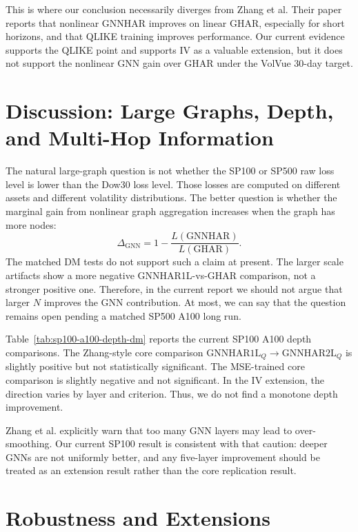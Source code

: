 \documentclass[11pt]{article}
\begin{document}


This is where our conclusion necessarily diverges from Zhang et al.
Their paper reports that nonlinear GNNHAR improves on linear GHAR, especially for short horizons, and that QLIKE training improves performance.
Our current evidence supports the QLIKE point and supports IV as a valuable extension, but it does not support the nonlinear GNN gain over GHAR under the VolVue 30-day target.

\section{Discussion: Large Graphs, Depth, and Multi-Hop Information}

The natural large-graph question is not whether the SP100 or SP500 raw loss level is lower than the Dow30 loss level.
Those losses are computed on different assets and different volatility distributions.
The better question is whether the marginal gain from nonlinear graph aggregation increases when the graph has more nodes:
\[
  \Delta_{\mathrm{GNN}}
  =
  1-\frac{L(\mathrm{GNNHAR})}{L(\mathrm{GHAR})}.
\]
The matched DM tests do not support such a claim at present.
The larger scale artifacts show a more negative GNNHAR1L-vs-GHAR comparison, not a stronger positive one.
Therefore, in the current report we should not argue that larger \(N\) improves the GNN contribution.
At most, we can say that the question remains open pending a matched SP500 A100 long run.

Table~\ref{tab:sp100-a100-depth-dm} reports the current SP100 A100 depth comparisons.
The Zhang-style core comparison \(\mathrm{GNNHAR1L}_Q\rightarrow\mathrm{GNNHAR2L}_Q\) is slightly positive but not statistically significant.
The MSE-trained core comparison is slightly negative and not significant.
In the IV extension, the direction varies by layer and criterion.
Thus, we do not find a monotone depth improvement.



Zhang et al. explicitly warn that too many GNN layers may lead to over-smoothing.
Our current SP100 result is consistent with that caution: deeper GNNs are not uniformly better, and any five-layer improvement should be treated as an extension result rather than the core replication result.

\section{Robustness and Extensions}
\end{document}
